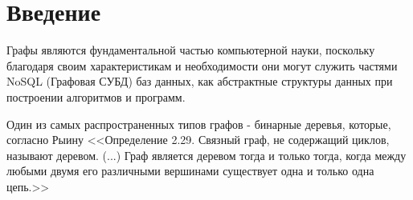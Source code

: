 
\section{Введение}

Графы являются фундаментальной частью компьютерной науки, поскольку благодаря
своим характеристикам и необходимости они могут служить частями NoSQL
(Графовая СУБД) баз данных, как абстрактные структуры данных при построении
алгоритмов и программ.

Один из самых распространенных типов графов - бинарные деревья, которые,
согласно Рыину \cite{discrete} <<Определение 2.29. Связный граф, не содержащий
циклов, называют деревом. (...) Граф является деревом тогда и только тогда,
когда между любыми двумя его различными вершинами существует одна и только одна
цепь.>>
